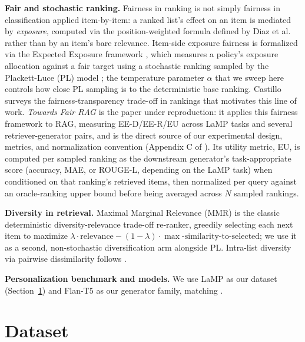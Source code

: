 \documentclass[10pt,twocolumn]{article}
\begin{document}
\textbf{Fair and stochastic ranking.} Fairness in ranking is not simply fairness in
classification applied item-by-item: a ranked list's effect on an item is mediated by
\emph{exposure}, computed via the position-weighted formula defined by Diaz et al.\
\cite{diaz2020evaluating} rather than by an item's bare relevance. Item-side exposure
fairness is formalized via the Expected Exposure framework \cite{diaz2020evaluating}, which
measures a policy's exposure allocation against a fair target using a stochastic
ranking sampled by the Plackett-Luce (PL) model
\cite{plackett1975analysis,luce1959individual}; the temperature parameter $\alpha$
that we sweep here controls how close PL sampling is to the deterministic base
ranking. Castillo \cite{castillo2018fairness} surveys the fairness-transparency
trade-off in rankings that motivates this line of work. \emph{Towards Fair RAG}
\cite{eunkim2025fairrag} is the paper under reproduction: it applies this fairness
framework to RAG, measuring EE-D/EE-R/EU across LaMP tasks and several
retriever-generator pairs, and is the direct source of our experimental design,
metrics, and normalization convention (Appendix C of \cite{eunkim2025fairrag}). Its
utility metric, EU, is computed per sampled ranking as the downstream generator's
task-appropriate score (accuracy, MAE, or ROUGE-L, depending on the LaMP task) when
conditioned on that ranking's retrieved items, then normalized per query against an
oracle-ranking upper bound before being averaged across $N$ sampled rankings.

\textbf{Diversity in retrieval.} Maximal Marginal Relevance (MMR)
\cite{carbonell1998use} is the classic deterministic diversity-relevance trade-off
re-ranker, greedily selecting each next item to maximize $\lambda \cdot
\mathrm{relevance} - (1-\lambda)\cdot\max\text{-similarity-to-selected}$; we use it
as a second, non-stochastic diversification arm alongside PL. Intra-list diversity
via pairwise dissimilarity follows \cite{smyth2001similarity}.

\textbf{Personalization benchmark and models.} We use LaMP
\cite{salemi2023lamp} as our dataset (Section~\ref{sec:data}) and Flan-T5
\cite{chung2024scaling} as our generator family, matching \cite{eunkim2025fairrag}.

\section{Dataset}
\label{sec:data}
\end{document}
